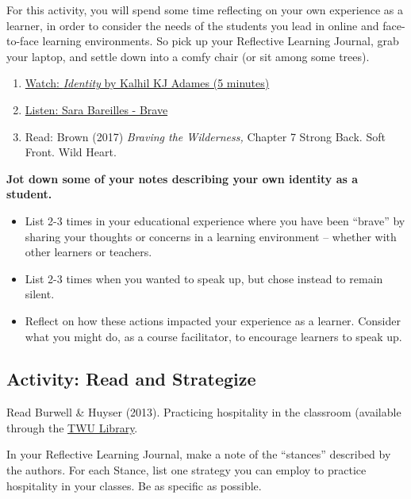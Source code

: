 \documentclass[
]{book}
\providecommand{\tightlist}{%
  \setlength{\itemsep}{0pt}\setlength{\parskip}{0pt}}
\begin{document}
\begin{reflect}
For this activity, you will spend some time reflecting on your own experience as a learner, in order to consider the needs of the students you lead in online and face-to-face learning environments. So pick up your Reflective Learning Journal, grab your laptop, and settle down into a comfy chair (or sit among some trees).

\begin{enumerate}
\def\labelenumi{\arabic{enumi}.}
\tightlist
\item
  \href{https://www.youtube.com/watch?v=ikGVWEvUzNM}{Watch: \emph{Identity} by Kalhil KJ Adames (5 minutes)}\\
\item
  \href{https://www.youtube.com/watch?v=QUQsqBqxoR4}{Listen: Sara Bareilles - Brave}\\
\item
  Read: Brown (2017) \emph{Braving the Wilderness,} Chapter 7 Strong Back. Soft Front. Wild Heart.
\end{enumerate}

\textbf{Jot down some of your notes describing your own identity as a student.}

\begin{itemize}
\tightlist
\item
  List 2-3 times in your educational experience where you have been ``brave'' by sharing your thoughts or concerns in a learning environment -- whether with other learners or teachers.\\
\item
  List 2-3 times when you wanted to speak up, but chose instead to remain silent.\\
\item
  Reflect on how these actions impacted your experience as a learner. Consider what you might do, as a course facilitator, to encourage learners to speak up.
\end{itemize}
\end{reflect}

\hypertarget{activity-read-and-strategize}{%
\subsection*{Activity: Read and Strategize}\label{activity-read-and-strategize}}

\begin{reflect}
Read Burwell \& Huyser (2013). Practicing hospitality in the classroom (available through the \href{https://www.twu.ca/library}{TWU Library}.

In your Reflective Learning Journal, make a note of the ``stances'' described by the authors. For each Stance, list one strategy you can employ to practice hospitality in your classes. Be as specific as possible.
\end{reflect}
\end{document}
